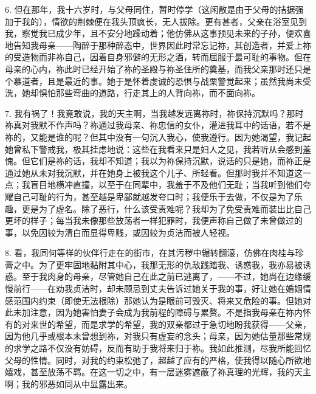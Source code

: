6. 但在那年，我十六岁时，与父母同住，暂时停学（这闲散是由于父母的拮据强加于我的），情欲的荆棘便在我头顶疯长，无人拔除。更有甚者，父亲在浴室见到我，察觉我已成少年，且不安分地躁动着；他仿佛从这事预见未来的子孙，便欢喜地告知我母亲——陶醉于那种醉态中，世界因此时常忘记祢，其创造者，并爱上祢的受造物而非祢自己，因着自身邪僻的无形之酒，转而屈服于最可耻的事物。但在母亲的心内，祢此时已经开始了祢的圣殿与祢圣住所的奠基，而我父亲那时还只是个慕道者，且是最近的事。她于是怀着虔诚的恐惧与战栗警觉起来；虽然我尚未受洗，她却惧怕那些弯曲的道路，行走其上的人背向祢，而不面向祢。\par

7. 我有祸了！我竟敢说，我的天主啊，当我越发远离祢时，祢保持沉默吗？那时祢真对我默不作声吗？祢通过我母亲、祢忠信的女仆，灌进我耳中的话语，若不是祢的，又能是谁的呢？但其中没有一句沉入我心，使我遵行。因为她渴望，我记起她曾私下警戒我，极其挂虑地说：这些在我看来只是妇人之见，我若听从会感到羞愧。但它们是祢的话，我却不知道；我以为祢保持沉默，说话的只是她，而祢正是通过她从未对我沉默，并在她身上被我这个儿子、所轻看。但那时我并不知道这一点；我盲目地横冲直撞，以至于在同辈中，我羞于不及他们无耻；当我听到他们夸耀自己可耻的行为，甚至越是卑鄙就越发夸口时；我便乐于去做，不仅是为了乐趣，更是为了虚名。除了恶行，什么该受责难呢？我却为了免受责难而装出比自己更坏的样子；每当我未像那些放荡者一样犯罪时，我便声称自己做了未曾做过的事，以免因较为清白而显得卑贱，或因较为贞洁而被人轻视。\par

8. 看，我同何等样的伙伴行走在的街市，在其污秽中辗转翻滚，仿佛在肉桂与珍膏之中。为了更牢固地黏附其中心，我那无形的仇敌践踏我、诱惑我，我亦易被诱惑。至于我肉身的母亲，尽管她自己在此之前已逃离了，——不过，她尚在边缘缓慢前行——在劝我贞洁时，却未顾忌到丈夫告诉过她关于我的事，好让她在婚姻情感范围内约束（即使无法根除）那她认为是眼前可毁灭、将来又危险的事。但她对此未加注意，因为她害怕妻子会成为我前程的障碍与累赘。不是指我母亲在祢内怀有的对来世的希望，而是求学的希望，我的双亲都过于急切地盼我获得——父亲，因为他几乎或根本未曾想到祢，对我只有虚妄的念头；母亲，因为她估量那些常规的求学之路不仅没有妨碍，反而有助于我将来归于祢。我如此推测，尽我所能回忆父母的性情。同时，对我的约束松弛了，超越了应有的严格，使我得以随心所欲地嬉戏，甚至放荡不羁。在这一切之中，有一层迷雾遮蔽了祢真理的光辉，我的天主啊；我的邪恶如同从中显露出来。\par


